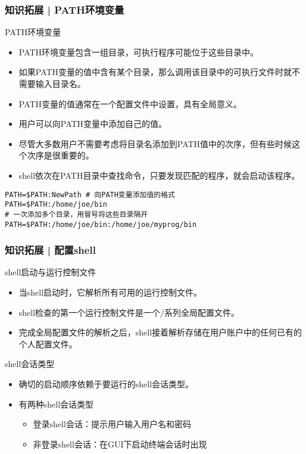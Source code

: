\begin{frame}[fragile]
  \frametitle{知识拓展 | PATH环境变量}
  \vspace{-0.5em}
  \begin{block}{PATH环境变量}
    \begin{itemize}
      \item PATH环境变量包含一组目录，可执行程序可能位于这些目录中。
      \item 如果PATH变量的值中含有某个目录，那么调用该目录中的可执行文件时就不需要输入目录名。
      \item PATH变量的值通常在一个配置文件中设置，具有全局意义。
      \item 用户可以向PATH变量中添加自己的值。
      \item 尽管大多数用户不需要考虑将目录名添加到PATH值中的次序，但有些时候这个次序是很重要的。
      \item shell依次在PATH目录中查找命令，只要发现匹配的程序，就会启动该程序。
    \end{itemize}
  \end{block}
  \pause
  \vspace{-1em}
\begin{lstlisting}
PATH=$PATH:NewPath # 向PATH变量添加值的格式
PATH=$PATH:/home/joe/bin
# 一次添加多个目录，用冒号将这些目录隔开
PATH=$PATH:/home/joe/bin:/home/joe/myprog/bin
\end{lstlisting}
\end{frame}

\begin{frame}
  \frametitle{知识拓展 | 配置shell}
  \begin{block}{shell启动与运行控制文件}
    \begin{itemize}
      \item 当shell启动时，它解析所有可用的运行控制文件。
      \item shell检查的第一个运行控制文件是一个/系列全局配置文件。
      \item 完成全局配置文件的解析之后，shell接着解析存储在用户账户中的任何已有的个人配置文件。
    \end{itemize}
  \end{block}
  \pause
  \begin{block}{shell会话类型}
    \begin{itemize}
      \item 确切的启动顺序依赖于要运行的shell会话类型。
      \item 有两种shell会话类型
        \begin{itemize}
          \item 登录shell会话：提示用户输入用户名和密码
          \item 非登录shell会话：在GUI下启动终端会话时出现
        \end{itemize}
    \end{itemize}
  \end{block}
\end{frame}

